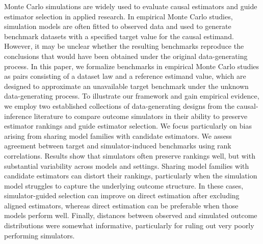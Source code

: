 Monte Carlo simulations are widely used to evaluate causal estimators and guide estimator selection in applied research. In empirical Monte Carlo studies, simulation models are often fitted to observed data and used to generate benchmark datasets with a specified target value for the causal estimand. However, it may be unclear whether the resulting benchmarks reproduce the conclusions that would have been obtained under the original data-generating process. In this paper, we formalize benchmarks in empirical Monte Carlo studies as pairs consisting of a dataset law and a reference estimand value, which are designed to approximate an unavailable target benchmark under the unknown data-generating process. To illustrate our framework and gain empirical evidence, we employ two established collections of data-generating designs from the causal-inference literature to compare outcome simulators in their ability to preserve estimator rankings and guide estimator selection. We focus particularly on bias arising from sharing model families with candidate estimators. We assess agreement between target and simulator-induced benchmarks using rank correlations. Results show that simulators often preserve rankings well, but with substantial variability across models and settings. Sharing model families with candidate estimators can distort their rankings, particularly when the simulation model struggles to capture the underlying outcome structure. In these cases, simulator-guided selection can improve on direct estimation after excluding aligned estimators, whereas direct estimation can be preferable when those models perform well. Finally, distances between observed and simulated outcome distributions were somewhat informative, particularly for ruling out very poorly performing simulators.

